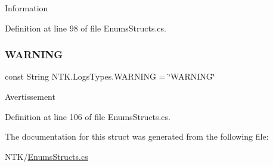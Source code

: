Information 



Definition at line 98 of file Enums\+Structs.\+cs.

\mbox{\label{struct_n_t_k_1_1_logs_types_a7800f659d99531ded46c623a3388f189}} 
\subsubsection{\texorpdfstring{WARNING}{WARNING}}
{\footnotesize\ttfamily const String N\+T\+K.\+Logs\+Types.\+W\+A\+R\+N\+I\+NG = \char`\"{}W\+A\+R\+N\+I\+NG\char`\"{}}



Avertissement 



Definition at line 106 of file Enums\+Structs.\+cs.



The documentation for this struct was generated from the following file\+:\begin{DoxyCompactItemize}
\item 
N\+T\+K/\mbox{\hyperlink{_enums_structs_8cs}{Enums\+Structs.\+cs}}\end{DoxyCompactItemize}
